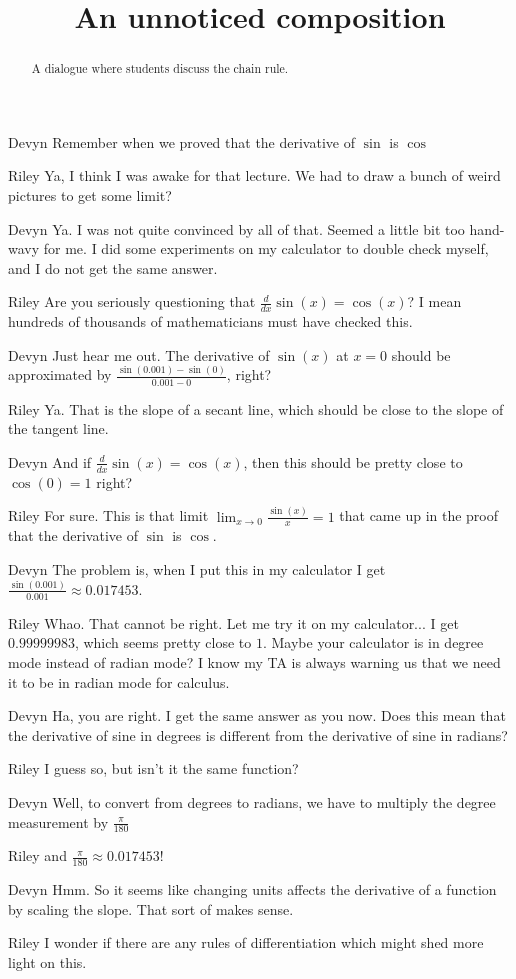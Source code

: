 \documentclass{ximera}
\title[Break-Ground:]{An unnoticed composition}
\begin{document}
\begin{abstract}
A dialogue where students discuss the chain rule.
\end{abstract}
\maketitle

\begin{dialogue}
\item[Devyn] Remember when we proved that the derivative of $\sin$ is $\cos$
\item[Riley] Ya, I think I was awake for that lecture.  We had to draw a bunch of weird pictures to get some limit?
\item[Devyn]  Ya.  I was not quite convinced by all of that.  Seemed a little bit too hand-wavy for me.  I did some experiments on my calculator to double check myself, and I do not get the same answer.
\item[Riley] Are you seriously questioning that $\frac{d}{dx} \sin(x) = \cos(x)$?  I mean hundreds of thousands of mathematicians must have checked this. 
\item[Devyn] Just hear me out.  The derivative of $\sin(x)$ at $x =0$ should be approximated by $\frac{\sin(0.001) - \sin(0)}{ 0.001 - 0}$, right?
\item[Riley] Ya.  That is the slope of a secant line, which should be close to the slope of the tangent line.
\item[Devyn] And if $\frac{d}{dx} \sin(x) = \cos(x)$, then this should be pretty close to $\cos(0) = 1$ right?
\item[Riley] For sure.  This is that limit $\lim_{x \to 0} \frac{\sin(x)}{x} = 1$ that came up in the proof that the derivative of $\sin$ is $\cos$.
\item[Devyn] The problem is, when I put this in my calculator I get $\frac{\sin(0.001)}{0.001} \approx 0.017453$.
\item[Riley] Whao.  That cannot be right.  Let me try it on my calculator...  I get $0.99999983$, which seems pretty close to $1$.  Maybe your calculator is in degree mode instead of radian mode?  I know my TA is always warning us that we need it to be in radian mode for calculus.
\item[Devyn] Ha, you are right.  I get the same answer as you now.  Does this mean that the derivative of sine in degrees is different from the derivative of sine in radians?
\item[Riley] I guess so, but isn't it the same function?
\item[Devyn] Well, to convert from degrees to radians, we have to multiply the degree measurement by $\frac{\pi}{180}$
\item[Riley] and $\frac{\pi}{180} \approx 0.017453$!
\item[Devyn] Hmm.  So it seems like changing units affects the derivative of a function by scaling the slope.  That sort of makes sense.
\item[Riley] I wonder if there are any rules of differentiation which might shed more light on this. 
\end{dialogue}
\end{document}
